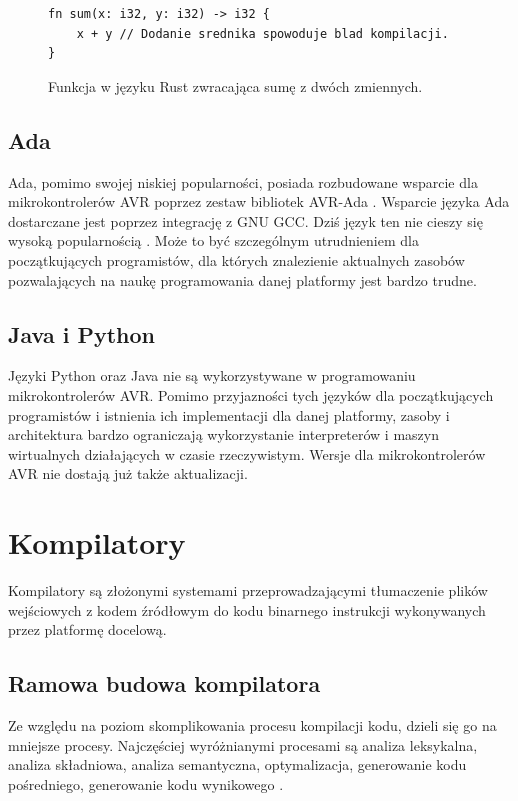 \begin{figure}
\begin{lstlisting}
fn sum(x: i32, y: i32) -> i32 {
	x + y // Dodanie srednika spowoduje blad kompilacji.
}
\end{lstlisting}
\caption{Funkcja w języku Rust zwracająca sumę z dwóch zmiennych.}
\label{fig:lst:rust-fn}
\end{figure}

\subsection{Ada}
Ada, pomimo swojej niskiej popularności, posiada rozbudowane wsparcie dla mikrokontrolerów AVR poprzez zestaw bibliotek AVR-Ada \cite{AVRAdaWikiHome}. Wsparcie języka Ada dostarczane jest poprzez integrację z GNU GCC. Dziś język ten nie cieszy się wysoką popularnością \cite{SOBRAL201930Y}. Może to być szczególnym utrudnieniem dla początkujących programistów, dla których znalezienie aktualnych zasobów pozwalających na naukę programowania danej platformy jest bardzo trudne.
\subsection{Java i Python}
Języki Python oraz Java nie są wykorzystywane w programowaniu mikrokontrolerów AVR. Pomimo przyjazności tych języków dla początkujących programistów i istnienia ich implementacji dla danej platformy, zasoby i architektura bardzo ograniczają wykorzystanie interpreterów i maszyn wirtualnych działających w czasie rzeczywistym. Wersje dla mikrokontrolerów AVR nie dostają już także aktualizacji.

\section{Kompilatory}
Kompilatory są złożonymi systemami przeprowadzającymi tłumaczenie plików wejściowych z kodem źródłowym do kodu binarnego instrukcji wykonywanych przez platformę docelową.

\subsection{Ramowa budowa kompilatora}
Ze względu na poziom skomplikowania procesu kompilacji kodu, dzieli się go na mniejsze procesy. Najczęściej wyróżnianymi procesami są analiza leksykalna, analiza składniowa, analiza semantyczna, optymalizacja, generowanie kodu pośredniego, generowanie kodu wynikowego \cite{Aho2022Kompilatory}.
